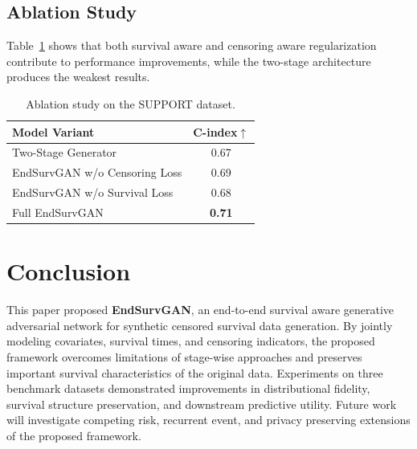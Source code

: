 \documentclass[twoside]{article}
\begin{document}
\subsection{Ablation Study}
Table~\ref{tab:ablation} shows that both survival aware and censoring aware regularization contribute to performance improvements, while the two-stage architecture produces the weakest results.
\begin{table}[h]
	\centering
	\caption{Ablation study on the SUPPORT dataset.}
	\label{tab:ablation}
	\small
	\begin{tabular}{lc}
		\hline
		Model Variant & C-index$\uparrow$ \\
		\hline
		Two-Stage Generator & 0.67 \\
		EndSurvGAN w/o Censoring Loss & 0.69 \\
		EndSurvGAN w/o Survival Loss & 0.68 \\
		Full EndSurvGAN & \textbf{0.71} \\
		\hline
	\end{tabular}
\end{table}
\section{Conclusion}
This paper proposed \textbf{EndSurvGAN}, an end-to-end survival aware generative adversarial network for synthetic censored survival data generation. By jointly modeling covariates, survival times, and censoring indicators, the proposed framework overcomes limitations of stage-wise approaches and preserves important survival characteristics of the original data.
Experiments on three benchmark datasets demonstrated improvements in distributional fidelity, survival structure preservation, and downstream predictive utility. Future work will investigate competing risk, recurrent event, and privacy preserving extensions of the proposed framework.
\end{document}
